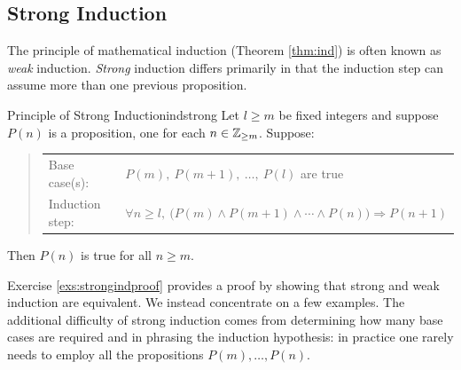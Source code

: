 % 
% 
% 
% 


\clearpage



\subsection{Strong Induction}\label{sec:strongind}

The principle of mathematical induction (Theorem \ref{thm:ind}) is often known as \emph{weak} induction. \emph{Strong} induction differs primarily in that the induction step can assume more than one previous proposition.

\begin{thm}{Principle of Strong Induction}{indstrong}
	Let $l\ge m$ be fixed integers and suppose $P(n)$ is a proposition, one for each $n\in\mathbb{Z}_{\ge m}$. Suppose:
	\begin{quote}
		\begin{tabular}{@{}ll}
			Base case(s): &$P(m),\ P(m+1),\ \ldots,\ P(l)$ are true\\[5pt]
			Induction step: &$\forall n\ge l,\ \bigl(P(m)\wedge P(m+1)\wedge\cdots\wedge P(n)\bigr)\Longrightarrow P(n+1)$
		\end{tabular}
	\end{quote}
	Then $P(n)$ is true for all $n\ge m$.
\end{thm}

Exercise \ref{exs:strongindproof} provides a proof by showing that strong and weak induction are equivalent. We instead concentrate on a few examples. The additional difficulty of strong induction comes from determining how many base cases are required and in phrasing the induction hypothesis: in practice one rarely needs to employ all the propositions $P(m),\ldots,P(n)$.


